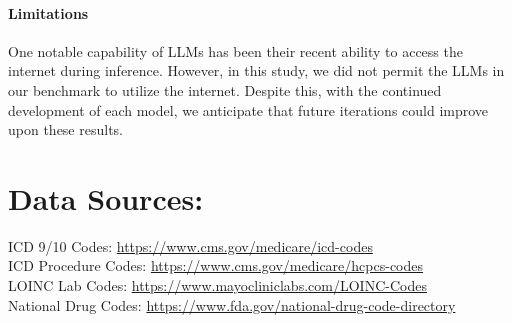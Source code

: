 \documentclass[11pt]{article}
\theoremstyle{plain}
\theoremstyle{definition}
\theoremstyle{remark}
\begin{document}
\paragraph{Limitations} One notable capability of LLMs has been their recent ability to access the internet during inference. However, in this study, we did not permit the LLMs in our benchmark to utilize the internet. Despite this, with the continued development of each model, we anticipate that future iterations could improve upon these results.




% 


\newpage
\appendix
\onecolumn
\section*{Data Sources:}
ICD 9/10 Codes: \href{https://www.cms.gov/medicare/coordination-benefits-recovery/overview/icd-code-lists}{https://www.cms.gov/medicare/icd-codes}\\
ICD Procedure Codes: \href{https://www.cms.gov/medicare/regulations-guidance/physician-self-referral/list-cpt-hcpcs-codes}{https://www.cms.gov/medicare/hcpcs-codes}\\
LOINC Lab Codes: \href{https://www.mayocliniclabs.com/test-catalog/appendix/LOINC-Codes}{https://www.mayocliniclabs.com/LOINC-Codes}\\
National Drug Codes: \href{https://www.fda.gov/drugs/drug-approvals-and-databases/national-drug-code-directory}{https://www.fda.gov/national-drug-code-directory}
\end{document}
